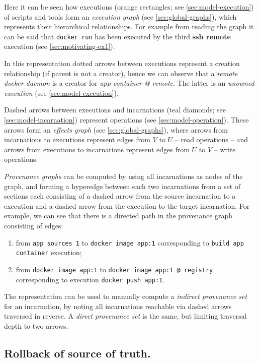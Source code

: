 Here it can be seen how executions (orange rectangles; see \cref{sec:model-execution}) of scripts and tools form an \textit{execution graph} (see \cref{sec:global-graphs}), which represents their hierarchical relationships. For example from reading the graph it can be said that \texttt{docker run} has been executed by the third \textbf{ssh remote} execution (see \cref{sec:motivating-ex1}).

In this representation dotted arrows between executions represent a creation relationship (if parent is not a creator), hence we can observe that a \textit{remote docker daemon} is a creator for \textit{app container @ remote}. The latter is an \textit{unowned execution} (see \cref{sec:model-execution}).

Dashed arrows between executions and incarnations (teal diamonds; see \cref{sec:model-incarnation}) represent operations (see \cref{sec:model-operation}). These arrows form an \textit{effects graph} (see \cref{sec:global-graphs}), where arrows from incarnations to executions represent edges from $V$ to $U$ -- read operations -- and arrows from executions to incarnations represent edges from $U$ to $V$ -- write operations.

\textit{Provenance graphs} can be computed by using all incarnations as nodes of the graph, and forming a hyperedge between each two incarnations from a set of sections each consisting of a dashed arrow from the source incarnation to a execution and a dashed arrow from the execution to the target incarnation. For example, we can see that there is a directed path in the provenance graph consisting of edges:
%
\begin{enumerate}[nosep]
    \item from \texttt{app sources 1} to \texttt{docker image app:1} corresponding to \texttt{build app container} execution;
    \item from \texttt{docker image app:1} to \texttt{docker image app:1 @ registry} corresponding to execution \texttt{docker push app:1}.
\end{enumerate}

The representation can be used to manually compute a \textit{indirect provenance set} for an incarnation, by noting all incarnations reachable via dashed arrows traversed in reverse. A \textit{direct provenance set} is the same, but limiting traversal depth to two arrows.

\bigskip

\subsection{Rollback of source of truth.}\label{sec:motivating-ex2-pedst}


